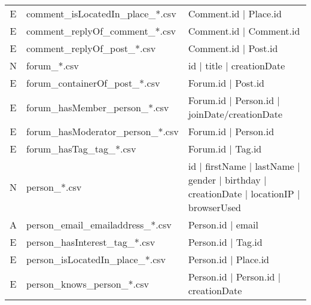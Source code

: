 \begin{table}[htb]
\begin{tabular}{|c|p{4.6cm}|p{9.8cm}|}
        E                       & comment\_isLocatedIn\_place\_*.csv      & Comment.id | Place.id                                                                   \\
        E                       & comment\_replyOf\_comment\_*.csv        & Comment.id | Comment.id                                                                 \\
        E                       & comment\_replyOf\_post\_*.csv           & Comment.id | Post.id                                                                    \\
        \hline
        N                       & forum\_*.csv                            & id | title | creationDate                                                               \\
        E                       & forum\_containerOf\_post\_*.csv         & Forum.id | Post.id                                                                      \\
        E                       & forum\_hasMember\_person\_*.csv         & Forum.id | Person.id | joinDate/creationDate                                            \\
        E                       & forum\_hasModerator\_person\_*.csv      & Forum.id | Person.id                                                                    \\
        E                       & forum\_hasTag\_tag\_*.csv               & Forum.id | Tag.id                                                                       \\
        \hline
        N                       & person\_*.csv                           & id | firstName | lastName | gender | birthday | creationDate | locationIP | browserUsed \\
        A                       & person\_email\_emailaddress\_*.csv      & Person.id | email                                                                       \\
        E                       & person\_hasInterest\_tag\_*.csv         & Person.id | Tag.id                                                                      \\
        E                       & person\_isLocatedIn\_place\_*.csv       & Person.id | Place.id                                                                    \\
        E                       & person\_knows\_person\_*.csv            & Person.id | Person.id | creationDate                                                    \\

\end{tabular}
\end{table}
